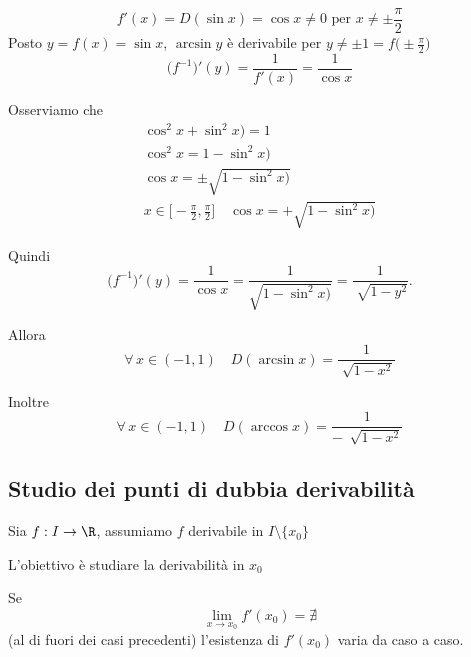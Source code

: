 \[
    f'(x)=D(\sin x)=\cos x \neq 0 \text{ per } x \neq \pm\frac{ \pi}{2}
\]
Posto $ y=f(x)=\sin x $, $ \arcsin y $ è derivabile per $ y\neq \pm 1 = f\bigl(\pm\frac{ \pi}{2}\bigr)$ \[
    \bigl(f^{-1}\bigr)'(y)=\frac{1}{f'(x)}=\frac{1}{\cos x}
\]

Osserviamo che \begin{gather*}
    \cos^{2}x + \sin^{2}x )=1\\
    \cos^{2}x =1- \sin^{2}x )\\
    \cos x =\pm \sqrt{1- \sin^{2}x )}\\
    x \in \biggl[-\frac{\pi}{2},\frac{\pi}{2}\biggr]\quad \cos x =+\sqrt{1- \sin^{2}x )}
\end{gather*}

Quindi
\[
    \bigl(f^{-1}\bigr)'(y)=\frac{1}{\cos x}=\frac{1}{\sqrt{1- \sin^{2}x )}}=\frac{1}{\sqrt[]{1-y^{2}}}.
\] 

Allora \begin{equation}
    \forall\,x \in (-1, 1)\quad D(\arcsin x)=\frac{1}{\sqrt[]{1-x^{2}}}
\end{equation}

Inoltre \begin{equation}
    \forall\,x \in (-1, 1)\quad D(\arccos x)=\frac{1}{-\:\sqrt[]{1-x^{2}}}
\end{equation}

\subsection{Studio dei punti di dubbia derivabilità}

Sia $ f:I\to \R $, assumiamo $ f $ derivabile in $ I\setminus \{x_0\} $

L'obiettivo è studiare la derivabilità in $ x_0 $

Se \[
    \lim_{x\to x_0} f'(x_0) = \nexists
\] (al di fuori dei casi precedenti) l'esistenza di $ f'(x_0) $ varia da caso a caso.

